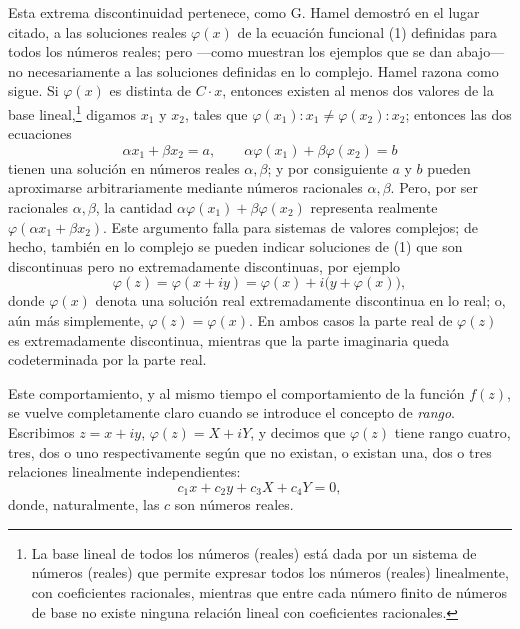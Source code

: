 \documentclass[11pt]{article}
\begin{document}
Esta extrema discontinuidad pertenece, como G. Hamel demostró en el lugar citado, a las soluciones reales $\varphi(x)$ de la ecuación funcional (1) definidas para todos los números reales; pero ---como muestran los ejemplos que se dan abajo--- no necesariamente a las soluciones definidas en lo complejo. Hamel razona como sigue. Si $\varphi(x)$ es distinta de $C\cdot x$, entonces existen al menos dos valores de la base lineal,\footnote{La base lineal de todos los números (reales) está dada por un sistema de números (reales) que permite expresar todos los números (reales) linealmente, con coeficientes racionales, mientras que entre cada número finito de números de base no existe ninguna relación lineal con coeficientes racionales.} digamos $x_1$ y $x_2$, tales que $\varphi(x_1):x_1\ne\varphi(x_2):x_2$; entonces las dos ecuaciones
\[
\alpha x_1+\beta x_2=a,
\qquad
\alpha\varphi(x_1)+\beta\varphi(x_2)=b
\]
tienen una solución en números reales $\alpha,\beta$; y por consiguiente $a$ y $b$ pueden aproximarse arbitrariamente mediante números racionales $\alpha,\beta$. Pero, por ser racionales $\alpha,\beta$, la cantidad $\alpha\varphi(x_1)+\beta\varphi(x_2)$ representa realmente $\varphi(\alpha x_1+\beta x_2)$. Este argumento falla para sistemas de valores complejos; de hecho, también en lo complejo se pueden indicar soluciones de (1) que son discontinuas pero no extremadamente discontinuas, por ejemplo
\[
\varphi(z)=\varphi(x+iy)=\varphi(x)+i\bigl(y+\varphi(x)\bigr),
\]
donde $\varphi(x)$ denota una solución real extremadamente discontinua en lo real; o, aún más simplemente, $\varphi(z)=\varphi(x)$. En ambos casos la parte real de $\varphi(z)$ es extremadamente discontinua, mientras que la parte imaginaria queda codeterminada por la parte real.

Este comportamiento, y al mismo tiempo el comportamiento de la función $f(z)$, se vuelve completamente claro cuando se introduce el concepto de \emph{rango}. Escribimos $z=x+iy$, $\varphi(z)=X+iY$, y decimos que $\varphi(z)$ tiene rango cuatro, tres, dos o uno respectivamente según que no existan, o existan una, dos o tres relaciones linealmente independientes:
\[
c_1x+c_2y+c_3X+c_4Y=0,
\]
donde, naturalmente, las $c$ son números reales.
\end{document}
